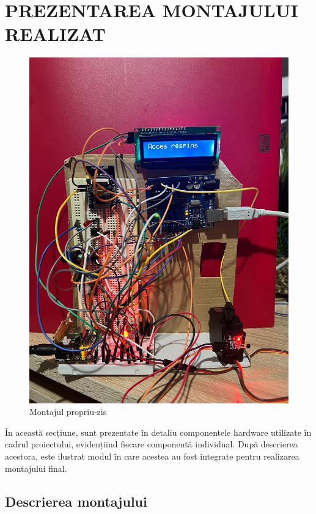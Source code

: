 \documentclass[a4paper,12pt]{report}
\begin{document}
\chapter*{PREZENTAREA MONTAJULUI REALIZAT}
\begin{figure}[H]
    \centering
    \includegraphics[width=0.7\linewidth]{montajul propriu-zis.jpg}
    \caption{Montajul propriu-zis}
    \label{fig:enter-label}
\end{figure}
În această secțiune, sunt prezentate în detaliu componentele hardware utilizate în cadrul proiectului, evidențiind fiecare componentă individual. După descrierea acestora, este ilustrat modul în care acestea au fost integrate pentru realizarea montajului final.

\section{Descrierea montajului}
\end{document}
